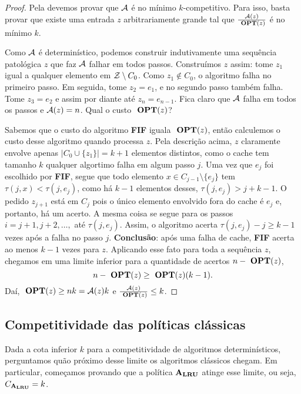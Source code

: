 \begin{proof}

  Pela  devemos provar que \(\mathcal{A}\) é no mínimo \(k\)-competitivo. Para isso, basta provar que existe uma entrada \(z\) arbitrariamente grande tal que \(\frac{\mathcal{A}(z)} {\ \textbf{OPT}(z)}\) é no mínimo \(k\). 

  Como \(\mathcal{A}\) é determinístico, podemos construir indutivamente uma sequência patológica \(z\) que faz \(\mathcal{A}\) falhar em todos passos. Construímos \(z\) assim: tome \(z_1\) igual a qualquer elemento em \(\mathcal{Z} \setminus C_0\). Como \(z_1 \notin C_0\), o algoritmo falha no primeiro passo. Em seguida, tome \(z_2 = e_1\), e no segundo passo também falha. Tome \(z_3 = e_2\) e assim por diante até \(z_n = e_{n-1}\). Fica claro que \(\mathcal{A}\) falha em todos os passos e \(\mathcal{A}(z) = n\). Qual o custo \(\ \textbf{OPT}(z)\)?

  Sabemos que o custo do algoritmo \textbf{FIF} iguala \(\ \textbf{OPT}(z)\), então calculemos o custo desse algoritmo quando processa \(z\). Pela descrição acima, \(z\) claramente envolve apenas \(|C_0 \cup \{z_1\}| = k+1\) elementos distintos, como o cache tem tamanho \(k\) qualquer algortimo falha em algum passo \(j\). Uma vez que \(e_j\) foi escolhido por \textbf{FIF}, segue que todo elemento \(x \in C_{j-1} \setminus \{e_j\}\) tem \(\tau(j,x) < \tau(j, e_j)\), como há \(k-1\) elementos desses, \(\tau(j, e_j) > j + k-1\). O pedido \(z_{j+1}\) está em \(C_j\) pois o único elemento envolvido fora do cache é \(e_j\) e, portanto, há um acerto. A mesma coisa se segue para os passos \(i = j+1, j+2, \dotsc,\) até \(\tau(j,e_j)\). Assim, o algoritmo acerta \(\tau(j, e_j) - j \ge k-1\) vezes após a falha no passo \(j\). \textbf{Conclusão}: após uma falha de cache, \textbf{FIF} acerta ao menos \(k-1\) vezes para \(z\). Aplicando esse fato para toda a sequência \(z\), chegamos em uma limite inferior para a quantidade de acertos \(n-\ \textbf{OPT}(z)\),
\begin{equation*}
  n - \ \textbf{OPT}(z) \ge \ \textbf{OPT}(z)(k-1).
\end{equation*}
Daí, \(\ \textbf{OPT}(z) \ge nk = \mathcal{A}(z)k\) e \(\frac{\mathcal{A}(z)}{\ \textbf{OPT}(z)} \le k\).

\end{proof}

\subsection{Competitividade das políticas clássicas}

Dada a cota inferior \(k\) para a competitividade de algoritmos determinísticos, perguntamos quão próximo desse limite os algoritmos clássicos chegam. Em particular, começamos provando que a política \(\mathbf{A_{LRU}}\) atinge esse limite, ou seja, \(C_{\mathbf{A_{LRU}}} = k\).

